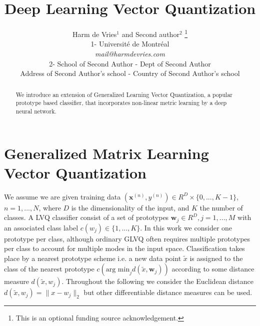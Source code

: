 \documentclass{esannV2}
\begin{document}
\title{Deep Learning Vector Quantization}

\author{Harm de Vries$^1$ and Second author$^2$
%
\thanks{This is an optional funding source acknowledgement.}
%
\vspace{.3cm}\\
%
1- Universit\'{e} de Montr\'{e}al \\
\textit{mail@harmdevries.com}
%
\vspace{.1cm}\\
2- School of Second Author - Dept of Second Author \\
Address of Second Author's school - Country of Second Author's school\\
}

\maketitle

\begin{abstract}
We introduce an extension of Generalized Learning Vector Quantization, a popular prototype based classifier, that incorporates non-linear metric learning by a deep neural network. 
\end{abstract}


\section{Generalized Matrix Learning Vector Quantization}
We assume we are given training data $(\mathbf{x}^{(n)}, y^{(n)}) \in R^D \times \{0, ..., K-1\}$, $n=1, ..., N$, where $D$ is the dimensionality of the input, and $K$ the number of classes. A LVQ classifier consist of a set of prototypes ${\mathbf{w}_j} \in R^D, j=1, ..., M$ with an associated class label $c(w_j) \in \{1, ..., K\}$. In this work we consider one prototype per class, although ordinary GLVQ often requires multiple prototypes per class to account for multiple modes in the input space. Classification takes place by a nearest prototype scheme i.e. a new data point $\tilde{x}$ is assigned to the class of the nearest prototype $c(\mbox{arg min}_j d(\tilde{x}, \mathbf{w}_j))$ according to some distance measure $d(\tilde{x}, w_j)$. Throughout the following we consider the Euclidean distance $d(\tilde{x}, w_j) = \|x - w_j\|_2$ but other differentiable distance measures can be used. 
\end{document}
